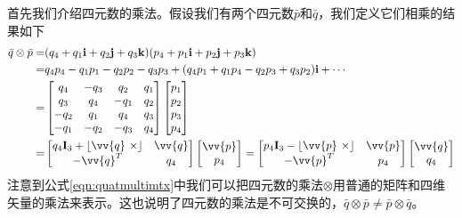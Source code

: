 \documentclass[11pt]{article}
\begin{document}
首先我们介绍四元数的乘法。假设我们有两个四元数$\bar{p}$和$\bar{q}$，我们定义它们相乘的结果如下
\begin{align}
\bar{q} \otimes \bar{p} = &  (q_4 + q_1\mathbf{i} + q_2\mathbf{j}+ q_3\mathbf{k}) (p_4 + p_1\mathbf{i} + p_2\mathbf{j}+ p_3\mathbf{k})   \\
 = & q_4 p_4 - q_1 p_1 - q_2 p_2 - q_3 p_3 + (q_4 p_1 + q_1 p_4 - q_2 p_3 + q_3 p_2 ) \mathbf{i} + \cdots\\
                 = &\begin{bmatrix}
                      q_4 & -q_3 & q_2 & q_1 \\
                      q_3 & q_4 & -q_1 & q_2 \\
                      -q_2 & q_1 & q_4 & q_3 \\
                      -q_1 & -q_2 & -q_3 & q_4 \\
                     \end{bmatrix} \begin{bmatrix}
                      p_1\\p_2\\p_3\\p_4
                     \end{bmatrix} \\
\label{eqn:quatmultimtx}          = & \begin{bmatrix}
                      q_4\mathbf{I}_3+\lfloor \vv{q} \ \times \rfloor   & \vv{q} \\
                      -\vv{q}^T & q_4  
                     \end{bmatrix} \begin{bmatrix}
                                     \vv{p}\\
                                     p_4
                                \end{bmatrix} =  \begin{bmatrix}
                                            p_4\mathbf{I}_3-\lfloor \vv{p} \ \times \rfloor   & \vv{p} \\
                                            -\vv{p}^T & p_4  
                                    \end{bmatrix} \begin{bmatrix}
                                            \vv{q}\\
                                            q_4
                                    \end{bmatrix}
\end{align}
注意到公式\ref{eqn:quatmultimtx}中我们可以把四元数的乘法$\otimes$用普通的矩阵和四维矢量的乘法来表示。这也说明了四元数的乘法是不可交换的，$\bar{q} \otimes \bar{p} \neq \bar{p} \otimes \bar{q}$。
\end{document}
